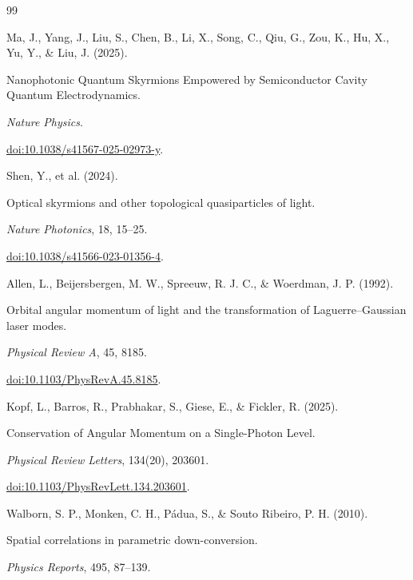 \documentclass[12pt]{article}
\begin{document}
\begin{thebibliography}{99}



Ma, J., Yang, J., Liu, S., Chen, B., Li, X., Song, C., Qiu, G., Zou, K., Hu, X., Yu, Y., \& Liu, J. (2025).

\newblock Nanophotonic Quantum Skyrmions Empowered by Semiconductor Cavity Quantum Electrodynamics.

\newblock \emph{Nature Physics}.

\newblock \href{https://doi.org/10.1038/s41567-025-02973-y}{doi:10.1038/s41567-025-02973-y}.


Shen, Y., et al. (2024).

\newblock Optical skyrmions and other topological quasiparticles of light.

\newblock \emph{Nature Photonics}, 18, 15–25.

\newblock \href{https://doi.org/10.1038/s41566-023-01356-4}{doi:10.1038/s41566-023-01356-4}.


Allen, L., Beijersbergen, M. W., Spreeuw, R. J. C., \& Woerdman, J. P. (1992).

\newblock Orbital angular momentum of light and the transformation of Laguerre–Gaussian laser modes.

\newblock \emph{Physical Review A}, 45, 8185.

\newblock \href{https://doi.org/10.1103/PhysRevA.45.8185}{doi:10.1103/PhysRevA.45.8185}.


Kopf, L., Barros, R., Prabhakar, S., Giese, E., \& Fickler, R. (2025).

\newblock Conservation of Angular Momentum on a Single-Photon Level.

\newblock \emph{Physical Review Letters}, 134(20), 203601.

\newblock \href{https://doi.org/10.1103/PhysRevLett.134.203601}{doi:10.1103/PhysRevLett.134.203601}.


Walborn, S. P., Monken, C. H., Pádua, S., \& Souto Ribeiro, P. H. (2010).

\newblock Spatial correlations in parametric down-conversion.

\newblock \emph{Physics Reports}, 495, 87–139.


\end{thebibliography}
\end{document}
